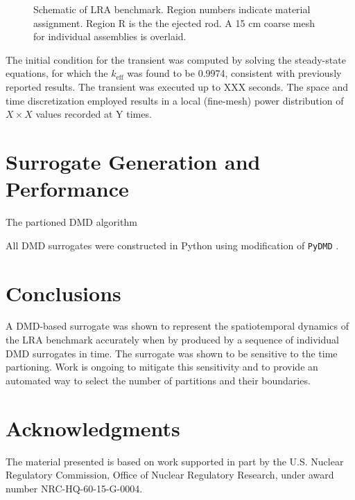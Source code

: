 \documentclass{anstrans}
\begin{document}
\begin{figure}
\caption{Schematic of LRA benchmark.  Region numbers indicate material assignment.  Region R is the the ejected rod.  A 15 cm coarse mesh for individual assemblies is overlaid.}
\label{fig:lra_core}
\end{figure}

The initial condition for the transient was computed by solving the steady-state equations, for which the $k_{\text{eff}}$ was found to be 0.9974, consistent with previously reported results.
The transient was executed up to XXX seconds.
The space and time discretization employed results in a local (fine-mesh) power distribution of $X \times X$ values recorded at Y times.


\section{Surrogate Generation and Performance}

The partioned DMD algorithm

All DMD surrogates were constructed in Python using modification of {\tt PyDMD} \cite{}.

\section{Conclusions}

A DMD-based surrogate was shown to represent the spatiotemporal dynamics of the LRA benchmark accurately when by produced by a sequence of individual DMD surrogates in time. 
The surrogate was shown to be sensitive to the time partioning.
Work is ongoing to mitigate this sensitivity and to provide an automated way to select the number of partitions and their boundaries.

\section{Acknowledgments}

The material presented is based on work supported in part by the U.S. Nuclear Regulatory Commission, Office of Nuclear Regulatory Research, under award number NRC-HQ-60-15-G-0004.



\end{document}
